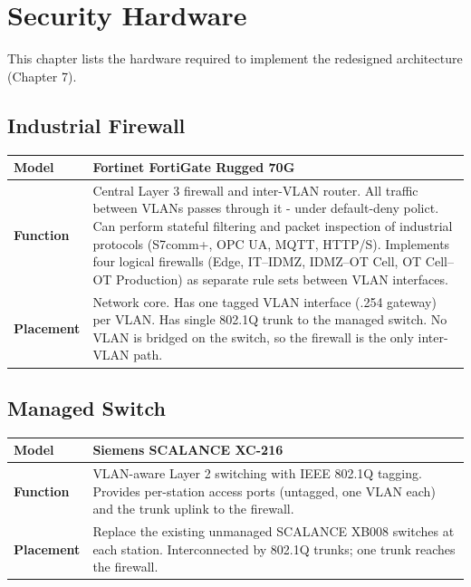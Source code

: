 \section{Security Hardware}
This chapter lists the hardware required to implement the redesigned architecture (Chapter 7). 

\subsection{Industrial Firewall}

\renewcommand{\arraystretch}{1.3} %
\begin{tabularx}{\textwidth}{>{\bfseries}p{2.5cm} X}
    \toprule
    Model & Fortinet FortiGate Rugged 70G \\
    \midrule
    Function & Central Layer 3 firewall and inter-VLAN router. All traffic between VLANs passes through it - under default-deny polict. 
    Can perform stateful filtering and packet inspection of industrial protocols (S7comm+, OPC UA, MQTT, HTTP/S). Implements four logical firewalls 
    (Edge, IT–IDMZ, IDMZ–OT Cell, OT Cell–OT Production) as separate rule sets between VLAN interfaces. \\
    \midrule
    Placement & Network core. Has one tagged VLAN interface (.254 gateway) per VLAN. Has single 802.1Q trunk to the managed switch. No VLAN is bridged on the switch, so the firewall is the only inter-VLAN path. \\
    \midrule
\end{tabularx}

\subsection{Managed Switch}
\renewcommand{\arraystretch}{1.3} %
\begin{tabularx}{\textwidth}{>{\bfseries}p{2.5cm} X}
    \toprule
    Model & Siemens SCALANCE XC-216  \\
    \midrule
    Function & VLAN-aware Layer 2 switching with IEEE 802.1Q tagging. Provides per-station access ports (untagged, one VLAN each) and the trunk uplink to the firewall. \\
    \midrule
    Placement & Replace the existing unmanaged SCALANCE XB008 switches at each station. Interconnected by 802.1Q trunks; one trunk reaches the firewall. \\
    \midrule
\end{tabularx}


